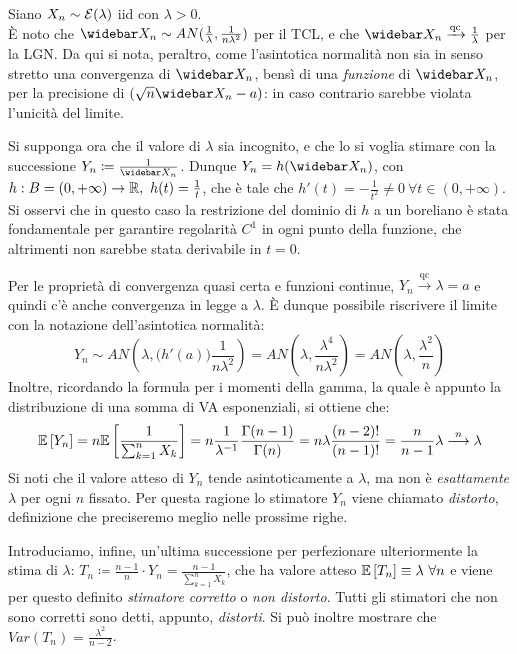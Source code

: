 \begin{ese}
  Siano $X_n \sim \mathcal E (\lambda)$ iid con $\lambda > 0$. \\
  È noto che $\widebar X_n \sim AN(\frac 1 \lambda, \frac 1 {n \lambda^2})$ per il TCL, e che $\widebar X_n \xrightarrow{\text{qc}} \frac 1 \lambda$ per la LGN.
  Da qui si nota, peraltro, come l'asintotica normalità non sia in senso stretto una convergenza di $\widebar X_n$, bensì di una \emph{funzione} di $\widebar X_n$, per la precisione di $(\sqrt n \widebar X_n - a)$: in caso contrario sarebbe violata l'unicità del limite.

  Si supponga ora che il valore di $\lambda$ sia incognito, e che lo si voglia stimare con la successione $Y_n \coloneqq \frac 1 {\widebar X_n}$. Dunque $Y_n = h(\widebar X_n)$, con $h: B = (0, +\infty) \to \mathbb R, \ h(t) = \frac 1 t$, che è tale che $h'(t) = - \frac 1 {t^2} \neq 0 \ \forall t \in (0,+\infty)$.
  Si osservi che in questo caso la restrizione del dominio di $h$ a un boreliano è stata fondamentale per garantire regolarità $C^1$ in ogni punto della funzione, che altrimenti non sarebbe stata derivabile in $t = 0$.

  Per le proprietà di convergenza quasi certa e funzioni continue, $Y_n \stackrel{\text{qc}}{\longrightarrow} \lambda = a$ e quindi c'è anche convergenza in legge a $\lambda$. È dunque possibile riscrivere il limite con la notazione dell'asintotica normalità:
  $$Y_n \sim AN\left( \lambda, \big( h'(a) \big) \frac 1 {n \lambda^2} \right) = AN\left( \lambda, \frac {\lambda^4} {n\lambda^2} \right) = AN\left( \lambda, \frac {\lambda^2} n \right)$$
  Inoltre, ricordando la formula per i momenti della gamma, la quale è appunto la distribuzione di una somma di VA esponenziali, si ottiene che:
  $$\mathbb E \left[ Y_n \right] = n \mathbb E \left[ \frac 1 { \sum_{k=1}^n {X_k} }  \right] = n \frac 1 {\lambda^{-1}} \frac{\Gamma(n-1)}{\Gamma(n)} = n \lambda \frac{(n-2)!}{(n-1)!} = \frac n {n-1} \lambda \stackrel{n}{\longrightarrow} \lambda
  $$
  Si noti che il valore atteso di $Y_n$ tende asintoticamente a $\lambda$, ma non è \emph{esattamente} $\lambda$ per ogni $n$ fissato.
  Per questa ragione lo stimatore $Y_n$ viene chiamato \emph{distorto}, definizione che preciseremo meglio nelle prossime righe.

  Introduciamo, infine, un'ultima successione per perfezionare ulteriormente la stima di $\lambda$: $T_n \coloneqq \frac{n-1} n \cdot Y_n = \frac{n-1}{\sum_{k=1}^n {X_k}}$, che ha valore atteso $\mathbb E \left[ T_n \right] \equiv \lambda \ \forall n$ e viene per questo definito \emph{stimatore corretto} o \emph{non distorto}.
  Tutti gli stimatori che non sono corretti sono detti, appunto, \emph{distorti}.
  Si può inoltre mostrare che $Var(T_n) = \frac{\lambda^2}{n-2}$.


\end{ese}
